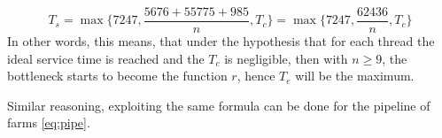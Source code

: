\begin{equation}\label{eq:service-time-estimated}
T_s=\max{\{7247, \frac{5676 + 55775 + 985}{n}, T_c\}}=\max{\{7247, \frac{62436}{n}, T_c\}}
\end{equation}
In other words, this means, that under the hypothesis that for each thread the ideal service time is reached and the $T_c$ is negligible, then with $n \ge 9$, the bottleneck starts to become the function $r$, hence $T_e$ will be the maximum.

Similar reasoning, exploiting the same formula can be done for the pipeline of farms \cref{eq:pipe}. 



